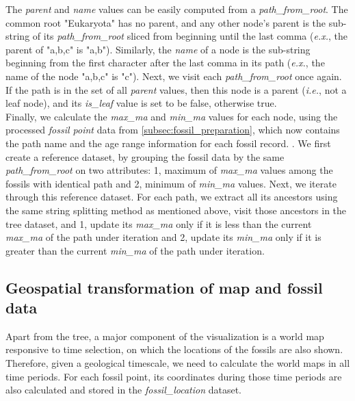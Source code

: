 \documentclass[11pt, a4paper,oneside,chapterprefix=false]{scrbook}
\newcommand{\FIXME}[1]{{\color{RED}{\textbf{FIX}: #1}}}
\begin{document}
The \emph{parent} and \emph{name} values can be easily computed from a \emph{path\_from\_root}. The common root "Eukaryota" has no parent, and any other node's parent is the sub-string of its \emph{path\_from\_root} sliced from beginning until the last comma (\emph{e.x.}, the parent of "a,b,c" is "a,b"). Similarly, the \emph{name} of a node is the sub-string beginning from the first character after the last comma in its path (\emph{e.x.}, the name of the node "a,b,c" is "c"). Next, we visit each \emph{path\_from\_root} once again. If the path is in the set of all \emph{parent} values, then this node is a parent (\emph{i.e.}, not a leaf node), and its \emph{is\_leaf} value is set to be false, otherwise true. \\

Finally, we calculate the \emph{max\_ma} and \emph{min\_ma} values for each node, using the processed \emph{fossil point} data from \ref{subsec:fossil_preparation}, which now contains the path name and the age range information for each fossil record. \FIXME{add pseudocode}. We first create a reference dataset, by grouping the fossil data by the same \emph{path\_from\_root} on two attributes: 1, maximum of \emph{max\_ma} values among the fossils with identical path and 2, minimum of \emph{min\_ma} values. Next, we iterate through this reference dataset. For each path, we extract all its ancestors using the same string splitting method as mentioned above, visit those ancestors in the tree dataset, and 1, update its \emph{max\_ma} only if it is less than the current \emph{max\_ma} of the path under iteration and 2, update its \emph{min\_ma} only if it is greater than the current \emph{min\_ma} of the path under iteration.

\subsection{Geospatial transformation of map and fossil data} \label{subsec:geospatial_transformation}
Apart from the tree, a major component of the visualization is a world map responsive to time selection, on which the locations of the fossils are also shown. Therefore, given a geological timescale, we need to calculate the world maps in all time periods. For each fossil point, its coordinates during those time periods are also calculated and stored in the \emph{fossil\_location} dataset. \\
\end{document}
